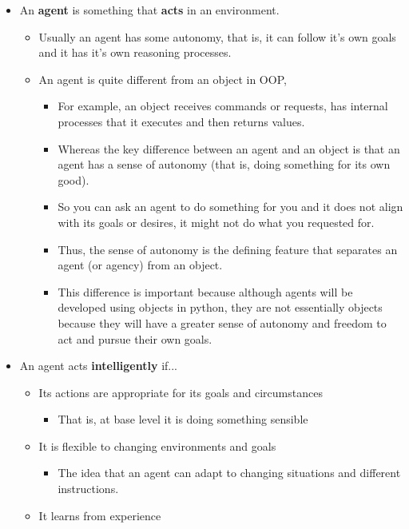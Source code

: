 \documentclass[12pt]{article}
\begin{document}
\begin{itemize}
    \item An \textbf{agent} is something that \textbf{acts} in an environment. 
    \begin{itemize}
        \item Usually an agent has some autonomy, that is, it can follow it's own goals and it has it's own reasoning processes.
        \item An agent is quite different from an object in OOP, 
        \begin{itemize}
            \item For example, an object receives commands or requests, has internal processes that it executes and then returns values.
            \item Whereas the key difference between an agent and an object is that an agent has a sense of autonomy (that is, doing something for its own good). 
            \item So you can ask an agent to do something for you and it does not align with its goals or desires, it might not do what you requested for.
            \item Thus, the sense of autonomy is the defining feature that separates an agent (or agency) from an object.
            \item This difference is important because although agents will be developed using objects in python, they are not essentially objects because they will have a greater sense of autonomy and freedom to act and pursue their own goals. 
        \end{itemize}
    \end{itemize}
    \item An agent acts \textbf{intelligently} if...
    \begin{itemize}
        \item Its actions are appropriate for its goals and circumstances
        \begin{itemize}
            \item That is, at base level it is doing something sensible
        \end{itemize}
        \item It is flexible to changing environments and goals
        \begin{itemize}
            \item The idea that an agent can adapt to changing situations and different instructions.
        \end{itemize}
        \item It learns from experience

\end{itemize}
\end{itemize}
\end{document}
